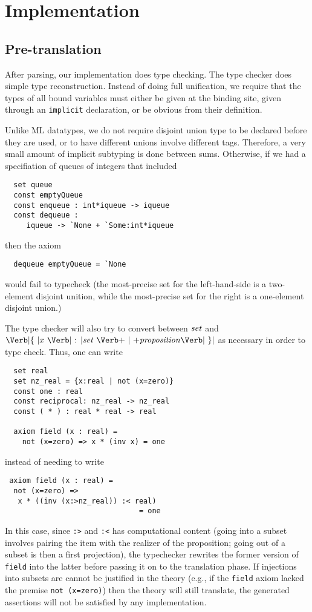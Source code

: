 
\section{Implementation}
\label{sec:implementation}

\subsection{Pre-translation}

After parsing, our implementation does type checking.  The type
checker does simple type reconstruction.  Instead of doing full
unification, we require that the types of all bound variables must
either be given at the binding site, given through an \Verb|implicit|
declaration, or be obvious from their definition.  

Unlike ML datatypes, we do not require disjoint union type
to be declared before they are used, or to have different unions
involve different tags.  Therefore, a very small amount of implicit 
subtyping is done between sums.  Otherwise, if we had a
specifiation of queues of integers that included
\begin{Verbatim}
  set queue
  const emptyQueue
  const enqueue : int*iqueue -> iqueue
  const dequeue : 
     iqueue -> `None + `Some:int*iqueue
\end{Verbatim}
then the axiom
\begin{Verbatim}
  dequeue emptyQueue = `None
\end{Verbatim}
would fail to typecheck (the most-precise set for the left-hand-side
is a two-element disjoint unition, while the most-precise set
for the right is a one-element disjoint union.)

The type checker will also try to convert between $\mbox{\textit{set}}$ and $\LBRACE
x \ \COLON \Setexp\ \BAR \Proposition \RBRACE$ as necessary in order
to type check.  Thus, one can write
\begin{Verbatim}
  set real
  set nz_real = {x:real | not (x=zero)}
  const one : real
  const reciprocal: nz_real -> nz_real
  const ( * ) : real * real -> real

  axiom field (x : real) =
    not (x=zero) => x * (inv x) = one
\end{Verbatim}
instead of needing to write
\begin{Verbatim}
 axiom field (x : real) =
  not (x=zero) => 
   x * ((inv (x:>nz_real)) :< real)
                               = one
\end{Verbatim}
In this case, since \Verb|:>| and \Verb|:<| has computational content
(going into a subset involves pairing the item with the realizer of
the proposition; going out of a subset is then a first projection),
the typechecker rewrites the former version of \Verb|field| into the
latter before passing it on to the translation phase.  If injections
into subsets are cannot be justified in the theory (e.g., if the
\Verb|field| axiom lacked the premise \Verb|not (x=zero)|) then the
theory will still translate, the generated assertions will not be
satisfied by any implementation.

